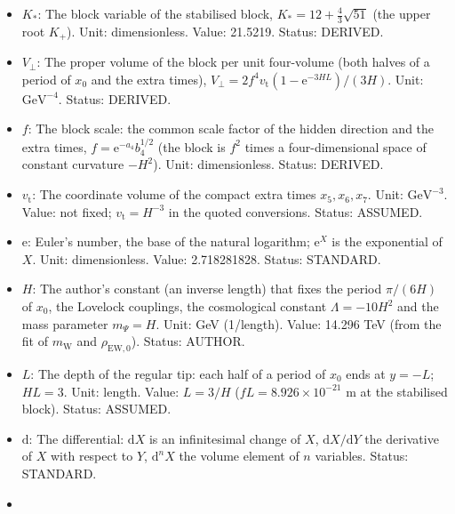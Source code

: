 \documentclass[
  10pt,
]{article}
\begin{document}
\begin{itemize}
  \(\mathcal{G}(K)\): The coefficient of the four-dimensional
  Einstein-Hilbert term on a static block,
  \(\mathcal{G}(K) = 1 - 24w_{(2)}K + 72w_{(3)}K^2 = (K^2 - 12K + 16)/16\);
  four-dimensional gravity is attractive for \(\mathcal{G} > 0\). Unit:
  dimensionless. Value:
  \(\mathcal{G}(K_*) = 20/3 + \sqrt{51} = 13.8081\). Status: DERIVED.
\item
  \(K_*\): The block variable of the stabilised block,
  \(K_* = 12 + \frac43\sqrt{51}\) (the upper root \(K_+\)). Unit:
  dimensionless. Value: 21.5219. Status: DERIVED.
\item
  \(V_\perp\): The proper volume of the block per unit four-volume (both
  halves of a period of \(x_0\) and the extra times),
  \(V_\perp = 2f^4v_{\mathrm{t}}(1 - \mathrm{e}^{-3HL})/(3H)\). Unit:
  \(\mathrm{GeV}^{-4}\). Status: DERIVED.
\item
  \(f\): The block scale: the common scale factor of the hidden
  direction and the extra times, \(f = \mathrm{e}^{-a_4}b_4^{1/2}\) (the
  block is \(f^2\) times a four-dimensional space of constant curvature
  \(-H^2\)). Unit: dimensionless. Status: DERIVED.
\item
  \(v_{\mathrm{t}}\): The coordinate volume of the compact extra times
  \(x_5, x_6, x_7\). Unit: \(\mathrm{GeV}^{-3}\). Value: not fixed;
  \(v_{\mathrm{t}} = H^{-3}\) in the quoted conversions. Status:
  ASSUMED.
\item
  \(\mathrm{e}\): Euler's number, the base of the natural logarithm;
  \(\mathrm{e}^{X}\) is the exponential of \(X\). Unit: dimensionless.
  Value: 2.718281828. Status: STANDARD.
\item
  \(H\): The author's constant (an inverse length) that fixes the period
  \(\pi/(6H)\) of \(x_0\), the Lovelock couplings, the cosmological
  constant \(\Lambda = -10H^2\) and the mass parameter \(m_\Psi = H\).
  Unit: GeV (1/length). Value: 14.296 TeV (from the fit of
  \(m_{\mathrm{W}}\) and \(\rho_{\mathrm{EW},0}\)). Status: AUTHOR.
\item
  \(L\): The depth of the regular tip: each half of a period of \(x_0\)
  ends at \(y = -L\); \(HL = 3\). Unit: length. Value: \(L = 3/H\)
  (\(fL = 8.926\times10^{-21}\) m at the stabilised block). Status:
  ASSUMED.
\item
  \(\mathrm{d}\): The differential: \(\mathrm{d}X\) is an infinitesimal
  change of \(X\), \(\mathrm{d}X/\mathrm{d}Y\) the derivative of \(X\)
  with respect to \(Y\), \(\mathrm{d}^nX\) the volume element of \(n\)
  variables. Status: STANDARD.
\item

\end{itemize}
\end{document}
